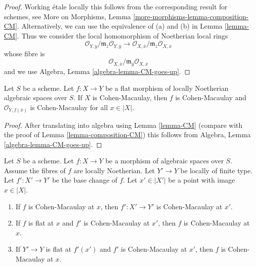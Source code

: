\begin{proof}
Working \'etale locally this follows from the corresponding result for
schemes, see
More on Morphisms, Lemma \ref{more-morphisms-lemma-composition-CM}.
Alternatively, we can use the equivalence of (a) and (b) in
Lemma \ref{lemma-CM}. Thus we consider the local homomorphism
of Noetherian local rings
$$
\mathcal{O}_{Y, \overline{y}}/
\mathfrak m_{\overline{z}}\mathcal{O}_{Y, \overline{y}}
\longrightarrow
\mathcal{O}_{X, \overline{x}}/
\mathfrak m_{\overline{z}}\mathcal{O}_{X, \overline{x}}
$$
whose fibre is
$$
\mathcal{O}_{X, \overline{x}}/
\mathfrak m_{\overline{y}}\mathcal{O}_{X, \overline{x}}
$$
and we use Algebra, Lemma \ref{algebra-lemma-CM-goes-up}.
\end{proof}

\begin{lemma}
\label{lemma-flat-morphism-from-CM}
Let $S$ be a scheme.
Let $f : X \to Y$ be a flat morphism of locally Noetherian
algebraic spaces over $S$.
If $X$ is Cohen-Macaulay, then $f$ is Cohen-Macaulay and
$\mathcal{O}_{Y, f(\overline{x})}$ is Cohen-Macaulay for all $x \in |X|$.
\end{lemma}

\begin{proof}
After translating into algebra using Lemma \ref{lemma-CM}
(compare with the proof of
Lemma \ref{lemma-composition-CM}) this follows from
Algebra, Lemma \ref{algebra-lemma-CM-goes-up}.
\end{proof}

\begin{lemma}
\label{lemma-base-change-CM}
Let $S$ be a scheme.
Let $f : X \to Y$ be a morphism of algebraic spaces over $S$.
Assume the fibres of $f$ are locally Noetherian.
Let $Y' \to Y$ be locally of finite type. Let $f' : X' \to Y'$
be the base change of $f$.
Let $x' \in |X'|$ be a point with image $x \in |X|$.
\begin{enumerate}
\item If $f$ is Cohen-Macaulay at $x$, then
$f' : X' \to Y'$ is Cohen-Macaulay at $x'$.
\item If $f$ is flat at $x$ and $f'$ is Cohen-Macaulay at $x'$, then $f$
is Cohen-Macaulay at $x$.
\item If $Y' \to Y$ is flat at $f'(x')$ and $f'$ is Cohen-Macaulay at
$x'$, then $f$ is Cohen-Macaulay at $x$.
\end{enumerate}
\end{lemma}

